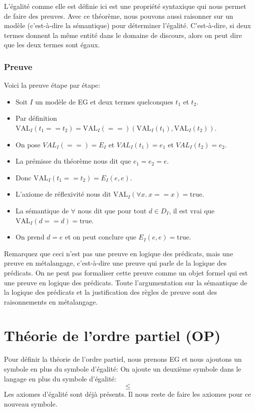 {L'égalité comme elle est définie ici est une propriété syntaxique qui nous permet de faire des preuves.
Avec ce théorème, nous pouvons aussi raisonner sur un modèle (c'est-à-dire la sémantique) pour déterminer l'égalité.
C'est-à-dire, si deux termes donnent la même entité dans le domaine de discours, alors on peut dire que les
deux termes sont égaux.

\subsubsection{Preuve}

Voici la preuve étape par étape:
\begin{itemize}
\item Soit $I$ un modèle de EG et deux termes quelconques $t_{1}$ et $t_{2}$.
\item Par définition $\mathrm{VAL}_{I}(t_{1} == t_{2}) = \mathrm{VAL}_{I}(==)(\mathrm{VAL}_{I}(t_{1}), \mathrm{VAL}_{I}(t_{2}))$.
\item On pose $VAL_{I}(==) = E_{I}$ et $VAL_{I}(t_{1}) = e_1$ et $VAL_{I}(t_{2}) = e_2$.
\item La prémisse du théorème nous dit que $e_1 = e_2 = e$.
\item Donc $\mathrm{VAL}_{I}(t_{1} == t_{2}) =E_{I}(e,e)$.
\item L'axiome de réflexivité nous dit $\mathrm{VAL}_{I}(\forall x.\ x==x)= \mathrm{true}$.
\item La sémantique de $\forall$ nous dit que pour tout $d \in D_I$, il est vrai que $\mathrm{VAL}_{I}(d==d)=\mathrm{true}$.
\item On prend $d=e$ et on peut conclure que $E_{I}(e,e)=\mathrm{true}$.
\end{itemize}

\vspace{\baselineskip}
Remarquez que ceci n'est pas une preuve en logique des prédicats, mais une preuve en métalangage, c'est-à-dire
une preuve qui parle de la logique des prédicats.
On ne peut pas formaliser cette preuve comme un objet formel qui est une preuve en logique des prédicats.
Toute l'argumentation sur la sémantique de la logique des prédicats et la justification des règles de preuve
sont des raisonnements en métalangage.

\section{Théorie de l'ordre partiel (OP)}

Pour définir la théorie de l'ordre partiel, nous prenons EG et nous ajoutons un symbole en
plus du symbole d'égalité:
On ajoute un deuxième symbole dans le langage en plus du symbole d'égalité:
	$$\leq$$
Les axiomes d'égalité sont déjà présents.
Il nous reste de faire les axiomes pour ce nouveau symbole.

}
